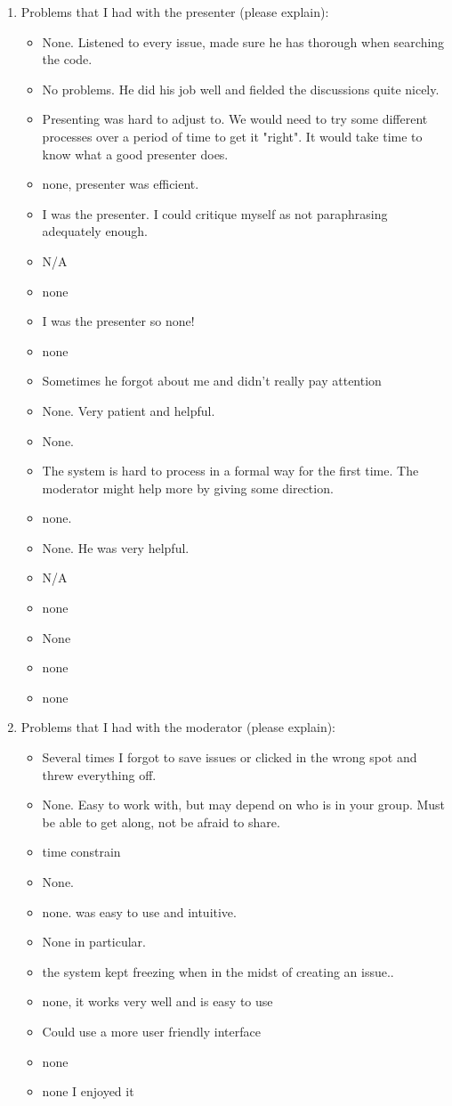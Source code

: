 \begin{enumerate}
\item Problems that I had with the presenter (please explain):
\begin{itemize}
\item None.  Listened to every issue, made sure he has thorough when
searching the code.
\item No problems.  He did his job well and fielded the 
 discussions quite nicely.
\item Presenting was hard to adjust to.  We would need to try some different
processes over a period of time to get it "right".  It would take time
to know what a good presenter does.
\item none, presenter was efficient.
\item I was the presenter.  I could critique myself as not paraphrasing
adequately enough.
\item N/A
\item none
\item I was the presenter so none!
\item none

\item Sometimes he forgot about me and didn't really pay attention
\end{itemize}
\begin{itemize}
\item None.  Very patient and helpful.
\item None.
\item The system is hard to process in a formal way for the first time.  The
moderator might help more by giving some direction.
\item none.
\item None.  He was very helpful.
\item N/A
\item none
\item None
\item none
\item none
\end{itemize}

\item Problems that I had with the moderator (please explain):
\begin{itemize}
\item Several times I forgot to save issues or clicked in the wrong spot and
threw everything off.
\item None.  Easy to work with, but may depend on who is in your group.
Must be able to get along, not be afraid to share.
\item time constrain
\item None.
\item none. was easy to use and intuitive.
\item None in particular.
\item the system kept freezing when in the midst of creating an issue..
\item none, it works very well and is easy to use
\item Could use a more user friendly interface
\item none
\item none I enjoyed it
\end{itemize}


\end{enumerate}
